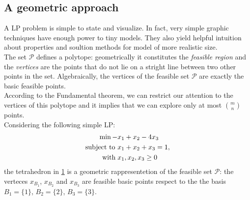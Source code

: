 \documentclass[a4paper,10 pt,titlepage,twoside]{book}
\theoremstyle{plain}
\theoremstyle{definition}
\theoremstyle{remark}
\begin{document}
\subsection*{A geometric approach}
A LP problem is simple to state and visualize. In fact, very simple graphic techniques have enough power to tiny models. They also yield helpful intuition about properties and soultion methods for model of more realistic size.\\ The set $\mathcal{P}$ defines a polytope: geometrically it constitutes the \textit{feasible region} and the \textit{vertices} are the points that do not lie on a stright line between two other points in the set. Algebraically, the vertices of the feasible set $\mathcal{P}$ are exactly the basic feasible points.\\ According to the Fundamental theorem, we can restrict our attention to the vertices of this polytope and it implies that we can explore only at most  ${m}\choose{n}$ points.\\[0.5cm]
Considering the following simple LP:
\begin{align*}
\min -&x_{1}+ x_{2}-4x_{3}\\
\text{subject to }&x_{1}+x_{2}+x_{3}=1,\\
 \text{\; with\;} &x_{1}, x_{2}, x_{3} \geq 0
\end{align*}
the tetrahedron in \ref{tetra} is a geometric rappresentetion of the feasible set $\mathcal{P}$: the verteces ${x}_{B_{1}}$, ${x}_{B_{2}}$ and ${x}_{B_{3}}$ are feasible basic points respect to the the basis $B_{1} =\{1\}$,  $B_{2} =\{2\}$,  $B_{3} =\{3\}$.
\begin{figure}[h]\caption{\label{tetra}}
\begin{center}
\end{center}
\end{figure}
\end{document}
